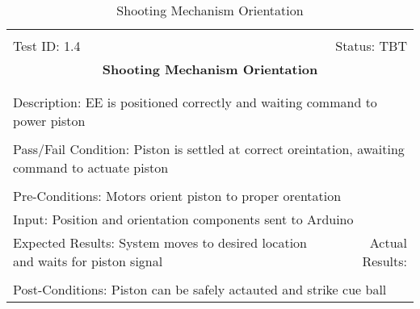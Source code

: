 \documentclass[titlepage]{article}
\begin{document}
\begin{center}%
\begin{table}
\begin{tabular}{|l r|}\hline&\\[-2mm]
	Test ID: 1.4	&Status: TBT\\[-3mm]
	\multicolumn{2}{|c|}{\textbf{\large{Shooting Mechanism Orientation}}}\\&\\\hline&\\[-3mm]
	\multicolumn{2}{|p{\textwidth}|}{Description: EE is positioned correctly and waiting command to power piston}\\[1mm]\hline&\\[-3mm]
	\multicolumn{2}{|p{\textwidth}|}{Pass/Fail Condition: Piston is settled at correct oreintation, awaiting command to actuate piston}\\[1mm]\hline&\\[-3mm]
	\multicolumn{2}{|p{\textwidth}|}{Pre-Conditions: Motors orient piston to proper orentation}\\[4mm]
	\multicolumn{2}{|p{\textwidth}|}{Input: Position and orientation components sent to Arduino}\\[2mm]\hline
	\multicolumn{1}{|p{0.49\textwidth}}{Expected Results: System moves to desired location and waits for piston signal}	&\multicolumn{1}{|p{0.45\textwidth}|}{Actual Results:}\\\hline&\\[-3mm]
	\multicolumn{2}{|p{\textwidth}|}{Post-Conditions: Piston can be safely actauted and strike cue ball}\\\hline
\end{tabular}
\caption{Shooting Mechanism Orientation}
\end{table}
\end{center}
\end{document}
